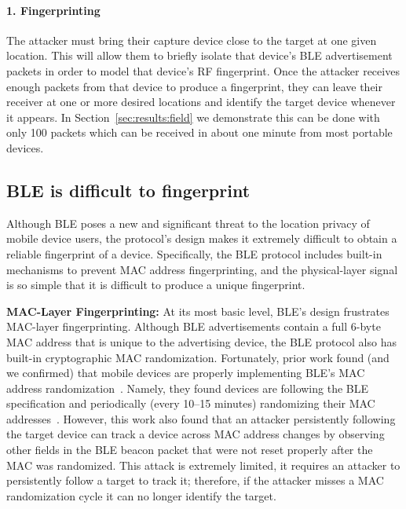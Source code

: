 \paragraph{1. Fingerprinting} The attacker must bring their capture device
close to the target at one given location. This will allow them to briefly
isolate that device's BLE advertisement packets in order to model that device's
RF fingerprint.  Once the attacker receives enough packets from that device to
produce a fingerprint, they can leave their receiver at one or more desired
locations and identify the target device whenever it appears. In
Section~\ref{sec:results:field} we demonstrate this can be done with only 100
packets which can be received in about one minute from most portable devices.  
\fi



\subsection{BLE is difficult to fingerprint} %
\label{sec:motivation:diff}

Although BLE poses a new and significant threat to the location privacy of
mobile device users, the protocol's design makes it extremely difficult to
obtain a reliable fingerprint of a device.
%
Specifically, the BLE protocol includes built-in mechanisms to prevent MAC
address fingerprinting, and the physical-layer signal is so simple that it is
difficult to produce a unique fingerprint.

\vspace{0.5em}
\noindent\textbf{MAC-Layer Fingerprinting:} 
%
At its most basic level, BLE's design frustrates MAC-layer fingerprinting.
%
Although BLE advertisements contain a full 6-byte MAC address that is unique to the
advertising device, the BLE protocol also has built-in cryptographic MAC randomization.
%
Fortunately, prior work found (and we confirmed) that mobile devices are
properly implementing BLE's MAC address randomization~\cite{Iphonetracking_becker,MACRandomizationfail_Martin}.
%
Namely, they found devices are following the BLE specification and periodically
(every 10--15 minutes) randomizing their MAC addresses~\cite{BTsigprivacy}.
%
However, this work also found that an attacker persistently following the target
device can track a device across MAC address changes by observing other fields
in the BLE beacon packet that were not reset properly after the MAC was
randomized.
%
This attack is extremely limited, it requires an attacker to
persistently follow a target to track it; therefore, if the attacker misses a
MAC randomization cycle it can no longer identify the target.

